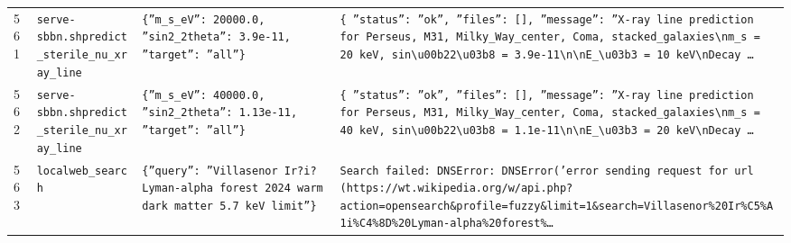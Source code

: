 \documentclass[11pt,a4paper]{article}
\begin{document}
\begin{longtable}{@{}p{}p{}p{}p{}@{}}
561 & \texttt{serve-sbbn.sh}\newline\texttt{predict\_\allowbreak{}sterile\_\allowbreak{}nu\_\allowbreak{}xray\_\allowbreak{}line} & \texttt{\{''m\_\allowbreak{}s\_\allowbreak{}eV'':\allowbreak{} 20000.0,\allowbreak{} ''sin2\_\allowbreak{}2theta'':\allowbreak{} 3.9e-11,\allowbreak{} ''target'':\allowbreak{} ''all''\}\allowbreak{}} & \texttt{\{   ''status'':\allowbreak{} ''ok'',\allowbreak{}   ''files'':\allowbreak{} []\allowbreak{},\allowbreak{}   ''message'':\allowbreak{} ''X-ray line prediction for Perseus,\allowbreak{} M31,\allowbreak{} Milky\_\allowbreak{}Way\_\allowbreak{}center,\allowbreak{} Coma,\allowbreak{} stacked\_\allowbreak{}galaxies\textbackslash{}\allowbreak{}nm\_\allowbreak{}s =\allowbreak{} 20 keV,\allowbreak{} sin\textbackslash{}\allowbreak{}u00b22\textbackslash{}\allowbreak{}u03b8 =\allowbreak{} 3.9e-11\textbackslash{}\allowbreak{}n\textbackslash{}\allowbreak{}nE\_\allowbreak{}\textbackslash{}\allowbreak{}u03b3 =\allowbreak{} 10 keV\textbackslash{}\allowbreak{}nDecay \ldots{}\allowbreak{}} \\
562 & \texttt{serve-sbbn.sh}\newline\texttt{predict\_\allowbreak{}sterile\_\allowbreak{}nu\_\allowbreak{}xray\_\allowbreak{}line} & \texttt{\{''m\_\allowbreak{}s\_\allowbreak{}eV'':\allowbreak{} 40000.0,\allowbreak{} ''sin2\_\allowbreak{}2theta'':\allowbreak{} 1.13e-11,\allowbreak{} ''target'':\allowbreak{} ''all''\}\allowbreak{}} & \texttt{\{   ''status'':\allowbreak{} ''ok'',\allowbreak{}   ''files'':\allowbreak{} []\allowbreak{},\allowbreak{}   ''message'':\allowbreak{} ''X-ray line prediction for Perseus,\allowbreak{} M31,\allowbreak{} Milky\_\allowbreak{}Way\_\allowbreak{}center,\allowbreak{} Coma,\allowbreak{} stacked\_\allowbreak{}galaxies\textbackslash{}\allowbreak{}nm\_\allowbreak{}s =\allowbreak{} 40 keV,\allowbreak{} sin\textbackslash{}\allowbreak{}u00b22\textbackslash{}\allowbreak{}u03b8 =\allowbreak{} 1.1e-11\textbackslash{}\allowbreak{}n\textbackslash{}\allowbreak{}nE\_\allowbreak{}\textbackslash{}\allowbreak{}u03b3 =\allowbreak{} 20 keV\textbackslash{}\allowbreak{}nDecay \ldots{}\allowbreak{}} \\
563 & \texttt{local}\newline\texttt{web\_\allowbreak{}search} & \texttt{\{''query'':\allowbreak{} ''Villasenor Ir?i? Lyman-alpha forest 2024 warm dark matter 5.7 keV limit''\}\allowbreak{}} & \texttt{Search failed:\allowbreak{} DNSError:\allowbreak{} DNSError('error sending request for url (https:\allowbreak{}/\allowbreak{}/\allowbreak{}wt.wikipedia.org/\allowbreak{}w/\allowbreak{}api.php?action=\allowbreak{}opensearch\&profile=\allowbreak{}fuzzy\&limit=\allowbreak{}1\&search=\allowbreak{}Villasenor\%20Ir\%C5\%A1i\%C4\%8D\%20Lyman-alpha\%20forest\%\ldots{}\allowbreak{}} \\

\end{longtable}
\end{document}
